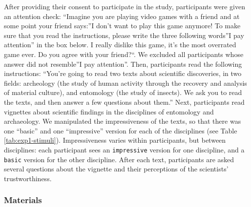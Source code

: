 \documentclass[
  doc,floatsintext]{apa6}
\begin{document}
After providing their consent to participate in the study, participants were given an attention check: ``Imagine you are playing video games with a friend and at some point your friend says:''I don't want to play this game anymore! To make sure that you read the instructions, please write the three following words''I pay attention'' in the box below. I really dislike this game, it's the most overrated game ever. Do you agree with your friend?``. We excluded all participants whose answer did not resemble''I pay attention''. Then, participants read the following instructions: ``You're going to read two texts about scientific discoveries, in two fields: archeology (the study of human activity through the recovery and analysis of material culture), and entomology (the study of insects). We ask you to read the texts, and then answer a few questions about them.'' Next, participants read vignettes about scientific findings in the disciplines of entomology and archaeology. We manipulated the impressiveness of the texts, so that there was one ``basic'' and one ``impressive'' version for each of the disciplines (see Table \ref{tab:exp1-stimuli}). Impressiveness varies within participants, but between disciplines: each participant sees an \texttt{impressive} version for one discipline, and a \texttt{basic} version for the other discipline. After each text, participants are asked several questions about the vignette and their perceptions of the scientists' trustworthiness.

\hypertarget{materials}{%
\subsubsection{Materials}\label{materials}}
\end{document}
